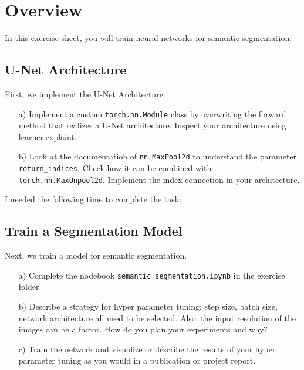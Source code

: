 \def\firstname{Tim}
\def\lastname{Dahmen}
\def\aufgabenblatt{6}


\newcommand{\vgg}{\texttt{vgg16} }



\thispagestyle{page1} 

\section{Overview}

In this exercise sheet, you will train neural networks for semantic segmentation. 

\subsection{U-Net Architecture}

First, we implement the U-Net Architecture.

\begin{enumerate}

\item[a)] Implement a custom \texttt{torch.nn.Module} class by overwriting the forward method that realizes a U-Net architecture. Inspect your architecture using learner.explaint.

\item[b)] Look at the documentatiob of \texttt{nn.MaxPool2d} to understand the parameter \texttt{return\_indices}. Check how it can be combined with \texttt{torch.nn.MaxUnpool2d}. Implement the index connection in your architecture.

\end{enumerate}

I needed the following time to complete the task:

\subsection{Train a Segmentation Model}

Next, we train a model for semantic segmentation.

\begin{enumerate}

\item[a)] Complete the nodebook \texttt{semantic\_segmentation.ipynb} in the exercise folder. 

\item[b)] Describe a strategy for hyper parameter tuning: step size, batch size, network architecture all need to be selected. Also: the input resolution of the images can be a factor. How do you plan your experiments and why?

\item[c)] Train the network and visualize or describe the results of your  hyper parameter tuning as you would in a publication or project report.

\end{enumerate}

